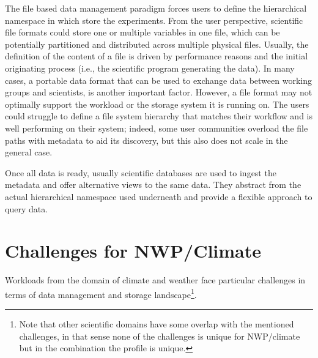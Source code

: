 \documentclass{../../template/esiwace-report}
\begin{document}
The file based data management paradigm forces users to define the hierarchical namespace in which store the experiments.
From the user perspective, scientific file formats could store one or multiple variables in one file, which can be potentially partitioned and distributed across 
multiple physical files. Usually, the definition of the content of a file is driven by performance reasons and the initial originating process (i.e., the scientific 
program generating the data). In many cases, a portable data format that can be used to exchange data between working groups and scientists, is another important factor. 
However, a file format may not optimally support the workload or the storage system it is running on. The users could struggle to define a file system hierarchy that matches 
their workflow and is well performing on their system; indeed, some user communities overload the file paths with metadata to aid its discovery, but this also does not scale in the general case.

Once all data is ready, usually scientific databases are used to ingest the metadata and offer alternative views to the same data. They abstract from the actual 
hierarchical namespace used underneath and provide a flexible approach to query data.





\section{Challenges for NWP/Climate}

Workloads from the domain of climate and weather face particular challenges in terms of data management and storage landscape\footnote{Note that other scientific domains have some overlap with the mentioned challenges, in that sense none of the challenges is unique for NWP/climate but in the combination the profile is unique.}.
\end{document}
